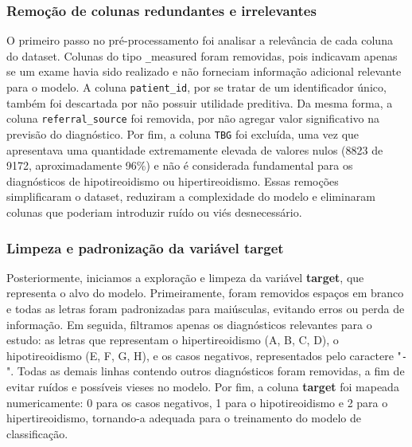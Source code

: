\documentclass[11pt]{article}
\begin{document}
\subsubsection{Remoção de colunas redundantes e irrelevantes}
O primeiro passo no pré-processamento foi analisar a relevância de cada coluna do dataset. Colunas do tipo \texttt*\_measured foram removidas, pois indicavam apenas se um exame havia sido realizado e não forneciam informação adicional relevante para o modelo. A coluna \texttt{patient\_id}, por se tratar de um identificador único, também foi descartada por não possuir utilidade preditiva. Da mesma forma, a coluna \texttt{referral\_source} foi removida, por não agregar valor significativo na previsão do diagnóstico. Por fim, a coluna \texttt{TBG} foi excluída, uma vez que apresentava uma quantidade extremamente elevada de valores nulos (8823 de 9172, aproximadamente 96\%) e não é considerada fundamental para os diagnósticos de hipotireoidismo ou hipertireoidismo.
Essas remoções simplificaram o dataset, reduziram a complexidade do modelo e eliminaram colunas que poderiam introduzir ruído ou viés desnecessário.

\subsubsection{Limpeza e padronização da variável target}
Posteriormente, iniciamos a exploração e limpeza da variável \textbf{target}, que representa o alvo do modelo. Primeiramente, foram removidos espaços em branco e todas as letras foram padronizadas para maiúsculas, evitando erros ou perda de informação.  
Em seguida, filtramos apenas os diagnósticos relevantes para o estudo: as letras que representam o hipertireoidismo (A, B, C, D), o hipotireoidismo (E, F, G, H), e os casos negativos, representados pelo caractere "\texttt{-}". Todas as demais linhas contendo outros diagnósticos foram removidas, a fim de evitar ruídos e possíveis vieses no modelo.  
Por fim, a coluna \textbf{target} foi mapeada numericamente: 0 para os casos negativos, 1 para o hipotireoidismo e 2 para o hipertireoidismo, tornando-a adequada para o treinamento do modelo de classificação.
\end{document}
